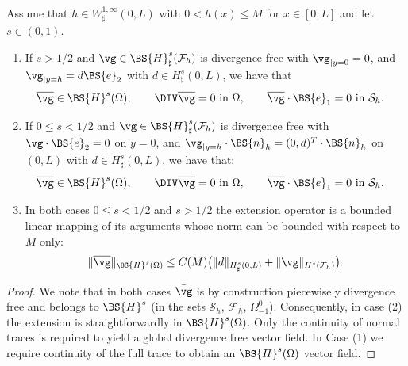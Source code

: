 \begin{lemma}
\label{lem:bar}
Assume that $h\in W^{1, \infty}_\sharp(0, L)$ with $0<h(x)\leq M$ for $x\in [0, L]$ and let $s \in (0,1)$.
\begin{enumerate}
\item If $s > 1/2$ and $\vg \in \BS{H}^s_{\sharp}(\mathcal{F}_h)$ is divergence free with $\vg_{|{y=0}}=0$, and $\vg_{|{y=h}}=d \BS{e}_{2}$ with $d\in H^{s}_\sharp(0, L)$, we have that
\begin{align*}
& \overline{\vg} \in \BS{H}^s(\Omega), \qquad \DIV \overline{\vg} = 0 \text{ in $\Omega$}, \qquad \overline\vg\cdot\BS{e}_1=0 \text{ in $\mathcal{S}_h$}.
\end{align*}

\item If $0\leq s<1/2$ and $\vg \in \BS{H}^s_{\sharp}(\mathcal{F}_h)$ is divergence free with $\vg\cdot\BS{e}_2=0$ on $y=0$, and $\vg_{|{y=h}} \cdot\BS{n}_h=(0, d)^T \cdot\BS{n}_h$ on $(0,L)$ with $d\in H^s_\sharp(0, L)$, we have that:
\begin{align*}
& \overline{\vg} \in \BS{H}^s(\Omega), \qquad \DIV \overline{\vg} = 0 \text{ in $\Omega$}, \qquad \overline\vg\cdot\BS{e}_1=0 \text{ in $\mathcal{S}_h$}.
\end{align*}
\item In both cases $0\leq s < 1/2$ and $s>1/2$ the extension operator is a bounded linear mapping of its arguments
whose norm can be bounded with respect to $M$ only:
\[
\|\overline{\vg}\|_{\BS{H}^s(\Omega)} \leq C(M)\bigl( \|d\|_{H^s_{\sharp}(0,L)} + \|\vg\|_{H^s(\mathcal F_h)} \bigr).
\]
\end{enumerate}
\end{lemma}

\begin{proof}
We note that in both cases $\bar{\vg}$ is by construction piecewisely divergence free and belongs to $\BS{H}^s$ (in the sets $ \mathcal{S}_h$, $ \mathcal{F}_h$, $ \Omega_{-1}^0$). Consequently, in case (2) the extension is straightforwardly in $\BS{H}^s(\Omega)$. Only the continuity of normal traces is required to yield a global divergence free vector field. In Case (1) we require continuity of the full trace to obtain an $\BS{H}^s(\Omega)$
vector field.
\end{proof}

